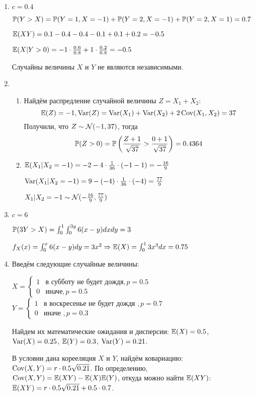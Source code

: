 \begin{enumerate}
\item $c=0.4$

$\P(Y>X) = \P(Y=1, X=-1) + \P(Y=2, X=-1) + \P(Y=2, X=1) = 0.7$

$\E(XY) = 0.1 -0.4 - 0.4 -0.1 + 0.1 +0.2 =-0.5$

$\E(X|Y>0) = -1\cdot\frac{0.6}{0.8} + 1\cdot \frac{0.2}{0.8} = -0.5$

Случайны величины $X$ и $Y$ не являются независимыми.
\item
\begin{enumerate}
\item Найдём распредление случайной величины $Z = X_1 + X_2$:
\[
\E(Z) = -1, \Var(Z) = \Var(X_1) + \Var(X_2) + 2 \Cov(X_1, X_2) = 37
\]
Получили, что $Z \sim \cN(-1, 37)$, тогда
\[
\P(Z>0) = \P\left(\frac{Z+1}{\sqrt{37}} > \frac{0+1}{\sqrt{37}}\right) = 0.4364
\]
\item $\E(X_1 | X_2 = -1) = -2 -4 \cdot \frac{1}{36} \cdot (-1 -1) = -\frac{16}{9}$

$\Var(X_1 | X_2 = -1) = 9 - (-4) \cdot \frac{1}{36} \cdot (-4) = \frac{77}{9}$

$X_1 | X_2 = -1 \sim \cN(-\frac{16}{9}, \frac{77}{9})$
\end{enumerate}
\item $c=6$

$\P(3Y>X) = \int_{0}^{1} \int_{0}^{3y} 6(x-y) dx dy = 3$

$f_{X} (x) = \int_{0}^{x} 6(x-y) dy = 3x^2 \Rightarrow \E(X) = \int_{0}^{1} 3x^3 dx = 0.75$
\item Введём следующие случайные величины:

$
X = \begin{cases}
1 & \text{в субботу не будет дождя}, p=0.5 \\
0 & \text{иначе}, p=0.5
\end{cases}
$
\hspace{0.5cm}
$
Y = \begin{cases}
1 & \text{в воскресенье не будет дождя }, p=0.7 \\
0 & \text{иначе }, p=0.3
\end{cases}
$

Найдем их математические ожидания и дисперсии: $\E(X)=0.5$, $\Var(X)=0.25$, $\E(Y)=0.3$, $\Var(Y)=0.21$.

В условии дана корееляция $X$ и $Y$, найдём ковариацию: $\Cov(X, Y) = r \cdot 0.5 \sqrt{0.21}$.
По определению, $\Cov(X, Y) = \E(XY)-\E(X)\E(Y)$, откуда можно найти $\E(XY)$: $\E(XY) = r \cdot 0.5 \sqrt{0.21} + 0.5\cdot0.7$.


\end{enumerate}
